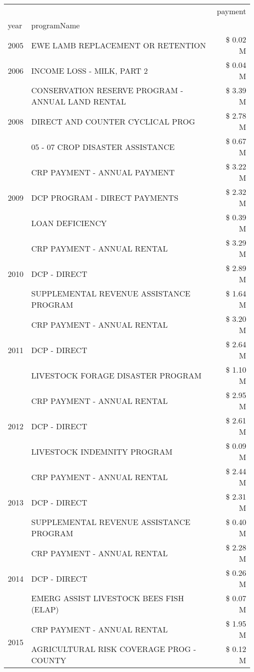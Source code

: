 \begin{tabular}{llr}
\toprule
 &  & payment \\
year & programName &  \\
\midrule
2005 & EWE LAMB REPLACEMENT OR RETENTION & \$ 0.02 M \\
\cline{1-3}
2006 & INCOME LOSS - MILK, PART 2 & \$ 0.04 M \\
\cline{1-3}
\multirow[t]{3}{*}{2008} & CONSERVATION RESERVE PROGRAM - ANNUAL LAND RENTAL & \$ 3.39 M \\
 & DIRECT AND COUNTER CYCLICAL PROG & \$ 2.78 M \\
 & 05 - 07 CROP DISASTER ASSISTANCE & \$ 0.67 M \\
\cline{1-3}
\multirow[t]{3}{*}{2009} & CRP PAYMENT - ANNUAL PAYMENT & \$ 3.22 M \\
 & DCP PROGRAM - DIRECT PAYMENTS & \$ 2.32 M \\
 & LOAN DEFICIENCY & \$ 0.39 M \\
\cline{1-3}
\multirow[t]{3}{*}{2010} & CRP PAYMENT - ANNUAL RENTAL & \$ 3.29 M \\
 & DCP - DIRECT & \$ 2.89 M \\
 & SUPPLEMENTAL REVENUE ASSISTANCE PROGRAM & \$ 1.64 M \\
\cline{1-3}
\multirow[t]{3}{*}{2011} & CRP PAYMENT - ANNUAL RENTAL & \$ 3.20 M \\
 & DCP - DIRECT & \$ 2.64 M \\
 & LIVESTOCK FORAGE DISASTER PROGRAM & \$ 1.10 M \\
\cline{1-3}
\multirow[t]{3}{*}{2012} & CRP PAYMENT - ANNUAL RENTAL & \$ 2.95 M \\
 & DCP - DIRECT & \$ 2.61 M \\
 & LIVESTOCK INDEMNITY PROGRAM & \$ 0.09 M \\
\cline{1-3}
\multirow[t]{3}{*}{2013} & CRP PAYMENT - ANNUAL RENTAL & \$ 2.44 M \\
 & DCP - DIRECT & \$ 2.31 M \\
 & SUPPLEMENTAL REVENUE ASSISTANCE PROGRAM & \$ 0.40 M \\
\cline{1-3}
\multirow[t]{3}{*}{2014} & CRP PAYMENT - ANNUAL RENTAL & \$ 2.28 M \\
 & DCP - DIRECT & \$ 0.26 M \\
 & EMERG ASSIST LIVESTOCK BEES FISH (ELAP) & \$ 0.07 M \\
\cline{1-3}
\multirow[t]{3}{*}{2015} & CRP PAYMENT - ANNUAL RENTAL & \$ 1.95 M \\
 & AGRICULTURAL RISK COVERAGE PROG - COUNTY & \$ 0.12 M \\

\end{tabular}
